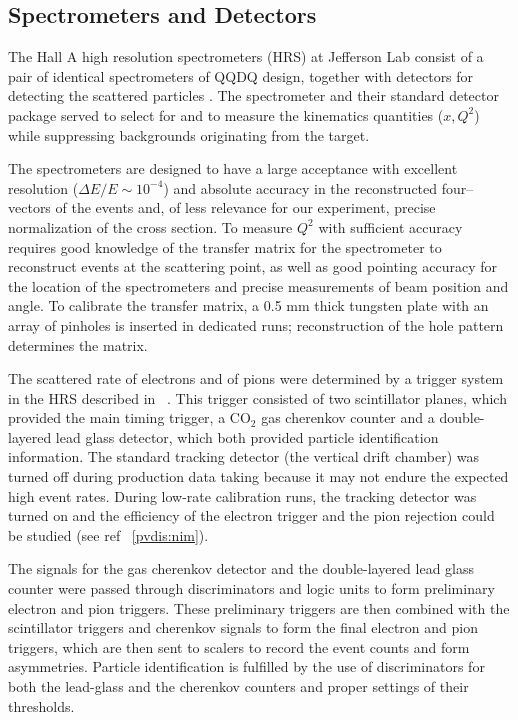 \subsection{Spectrometers and Detectors}\label{sec:HRS}

The Hall A high resolution spectrometers (HRS) at
Jefferson Lab consist of a pair
of identical spectrometers of QQDQ design,
together with detectors for detecting the 
scattered particles \cite{A-NIM}.
The spectrometer and their standard detector 
package served to select for and to 
measure the kinematics quantities ($x, Q^2$)
while suppressing backgrounds originating
from the target.

\par
The spectrometers are designed to have a
large acceptance with excellent 
resolution ($\Delta E / E \sim 10^{-4}$)
and absolute accuracy
in the reconstructed
four--vectors of the events and, 
of less relevance for our experiment,
precise normalization of the cross section.
To measure $Q^2$ with sufficient accuracy
requires good knowledge of the transfer matrix for
the spectrometer to reconstruct events at the
scattering point, as well as
good pointing accuracy for the location of the
spectrometers and precise measurements 
of beam position and angle.
To calibrate the transfer matrix, a 0.5 mm thick 
tungsten plate with an array of pinholes
is inserted in dedicated runs; reconstruction
of the hole pattern determines the matrix.

The scattered rate of electrons and of pions were 
determined by a trigger system
in the HRS described in ~\cite{pvdis_nim}.
This trigger consisted of two scintillator planes, which provided
the main timing trigger, a CO$_2$ gas cherenkov counter and a 
double-layered lead glass 
detector, which both provided particle identification information. 
The standard tracking detector (the vertical 
drift chamber) was turned off during production data 
taking because it may not endure
the expected high event rates. 
During low-rate calibration runs, the tracking detector 
was turned on and the efficiency of the electron trigger 
and the pion rejection could be studied (see ref ~\ref{pvdis:nim}).

The signals for
the gas cherenkov detector and the double-layered lead glass counter
were passed through discriminators and logic units to form 
preliminary electron and pion triggers. 
These preliminary triggers are then combined with the 
scintillator triggers and cherenkov 
signals to form the final electron and pion triggers, which are then 
sent to scalers to record the event counts and form asymmetries.  
Particle identification 
is fulfilled by the use of discriminators for both the lead-glass 
and the cherenkov counters 
and proper settings of their thresholds. 

